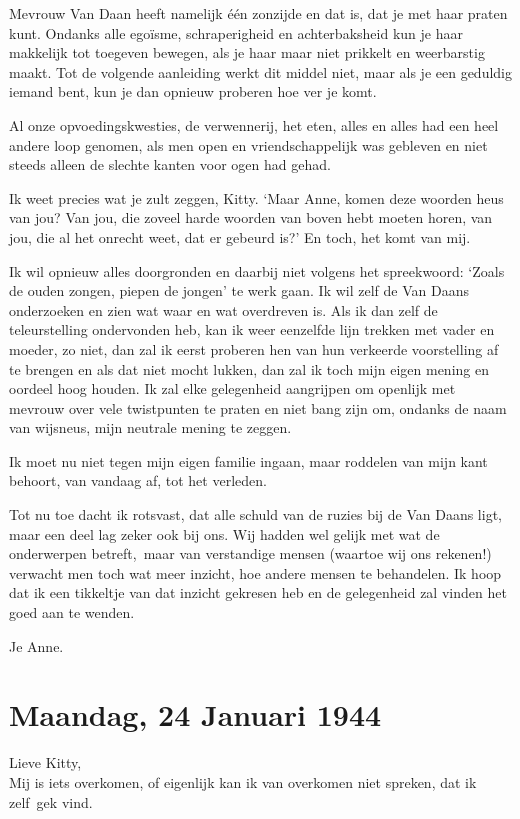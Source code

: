 \documentclass{book}
\begin{document}
Mevrouw Van Daan heeft namelijk één zonzijde en dat is, dat je met haar
praten kunt. Ondanks alle egoïsme, schraperigheid en achterbaksheid kun
je haar makkelijk tot toegeven bewegen, als je haar maar niet prikkelt
en weerbarstig maakt. Tot de volgende aanleiding werkt dit middel niet,
maar als je een geduldig iemand bent, kun je dan opnieuw proberen hoe
ver je komt.

Al onze opvoedingskwesties, de verwennerij, het eten, alles en alles had
een heel andere loop genomen, als men open en vriendschappelijk was
gebleven en niet steeds alleen de slechte kanten voor ogen had gehad.

Ik weet precies wat je zult zeggen, Kitty. `Maar Anne, komen deze
woorden heus van jou? Van jou, die zoveel harde woorden van boven hebt
moeten horen, van jou, die al het onrecht weet, dat er gebeurd is?' En
toch, het komt van mij.

Ik wil opnieuw alles doorgronden en daarbij niet volgens het
spreekwoord: `Zoals de ouden zongen, piepen de jongen' te werk gaan. Ik
wil zelf de Van Daans onderzoeken en zien wat waar en wat overdreven is.
Als ik dan zelf de teleurstelling ondervonden heb, kan ik weer eenzelfde
lijn trekken met vader en moeder, zo niet, dan zal ik eerst proberen hen
van hun verkeerde voorstelling af te brengen en als dat niet mocht
lukken, dan zal ik toch mijn eigen mening en oordeel hoog houden. Ik zal
elke gelegenheid aangrijpen om openlijk met mevrouw over vele
twistpunten te praten en niet bang zijn om, ondanks de naam van
wijsneus, mijn neutrale mening te zeggen.

Ik moet nu niet tegen mijn eigen familie ingaan, maar roddelen van mijn
kant behoort, van vandaag af, tot het verleden.

Tot nu toe dacht ik rotsvast, dat alle schuld van de ruzies bij de Van
Daans ligt, maar een deel lag zeker ook bij ons. Wij hadden wel gelijk
met wat de onderwerpen betreft,~maar van verstandige mensen (waartoe wij
ons rekenen!) verwacht men toch wat meer inzicht, hoe andere mensen te
behandelen. Ik hoop dat ik een tikkeltje van dat inzicht gekresen heb en
de gelegenheid zal vinden het goed aan te wenden.

Je Anne.

\chapter{Maandag, 24 Januari 1944}

Lieve Kitty,\\Mij is iets overkomen, of eigenlijk kan ik van overkomen
niet spreken, dat ik zelf~gek vind.
\end{document}
